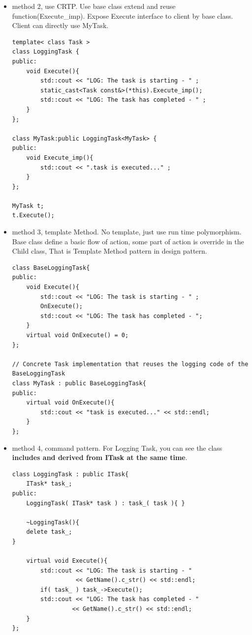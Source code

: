 \documentclass[a4paper,11pt,twoside]{book}
\begin{document}
\begin{itemize}
	\item method 2, use CRTP. Use base class extend and reuse function(Execute\_imp). Expose Execute interface to client by base class. Client can directly use MyTask.
	
\begin{lstlisting}[numbers=none]
template< class Task >
class LoggingTask {
public:
	void Execute(){
		std::cout << "LOG: The task is starting - " ;
		static_cast<Task const&>(*this).Execute_imp();
		std::cout << "LOG: The task has completed - " ;
	}
};
	
class MyTask:public LoggingTask<MyTask> {
public:
	void Execute_imp(){
		std::cout << ".task is executed..." ;
	}
};
	
MyTask t;
t.Execute();
\end{lstlisting}
	
	\item method 3, template Method. No template, just use run time polymorphism. Base class define a basic flow of action, some part of action is override in the Child class, That is Template Method pattern in design pattern.

\begin{lstlisting}[numbers=none]
class BaseLoggingTask{
public:
	void Execute(){
		std::cout << "LOG: The task is starting - " ;
		OnExecute();
		std::cout << "LOG: The task has completed - ";
	}
	virtual void OnExecute() = 0;
};
	
// Concrete Task implementation that reuses the logging code of the BaseLoggingTask
class MyTask : public BaseLoggingTask{
public:
	virtual void OnExecute(){
		std::cout << "task is executed..." << std::endl;
	}
};
	\end{lstlisting}
	
	\item method 4, command pattern. For Logging Task, you can see the class \textbf{includes and derived from ITask at the same time}. 



\begin{lstlisting}[numbers=none]
class LoggingTask : public ITask{
	ITask* task_;
public:
	LoggingTask( ITask* task ) : task_( task ){ }
	
	~LoggingTask(){
	delete task_;
}
	
	virtual void Execute(){
		std::cout << "LOG: The task is starting - " 
		          << GetName().c_str() << std::endl;
		if( task_ ) task_->Execute();
		std::cout << "LOG: The task has completed - " 
		         << GetName().c_str() << std::endl;
	}
};
	

\end{lstlisting}
\end{itemize}
\end{document}
